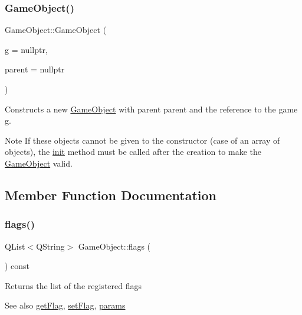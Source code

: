 \subsubsection{\texorpdfstring{Game\+Object()}{GameObject()}}
{\footnotesize\ttfamily Game\+Object\+::\+Game\+Object (\begin{DoxyParamCaption}\item[{\hyperlink{class_game}{Game} $\ast$}]{g = {\ttfamily nullptr},  }\item[{\hyperlink{class_game_object}{Game\+Object} $\ast$}]{parent = {\ttfamily nullptr} }\end{DoxyParamCaption})}

Constructs a new \hyperlink{class_game_object}{Game\+Object} with parent {\ttfamily parent} and the reference to the game {\ttfamily g}.

\begin{DoxyNote}{Note}
If these objects cannot be given to the constructor (case of an array of objects), the \hyperlink{class_game_object_a97be7b59b2e76e7d60de2146b894eed9}{init} method must be called after the creation to make the \hyperlink{class_game_object}{Game\+Object} valid. 
\end{DoxyNote}


\subsection{Member Function Documentation}
\hypertarget{class_game_object_ad6f21f7458be4192a920013dbb3e590e}{}\label{class_game_object_ad6f21f7458be4192a920013dbb3e590e} 
\subsubsection{\texorpdfstring{flags()}{flags()}}
{\footnotesize\ttfamily Q\+List$<$Q\+String$>$ Game\+Object\+::flags (\begin{DoxyParamCaption}{ }\end{DoxyParamCaption}) const\hspace{0.3cm}{\ttfamily [inline]}}

Returns the list of the registered flags

\begin{DoxySeeAlso}{See also}
\hyperlink{class_game_object_a16181f773a5685407bc3b314bb34ef71}{get\+Flag}, \hyperlink{class_game_object_ae7984096fc518b15c0b080c543e4c42f}{set\+Flag}, \hyperlink{class_game_object_a5d42c482092a7dde84261ac466e815c8}{params} 
\end{DoxySeeAlso}
\hypertarget{class_game_object_a16181f773a5685407bc3b314bb34ef71}{}\label{class_game_object_a16181f773a5685407bc3b314bb34ef71} 
